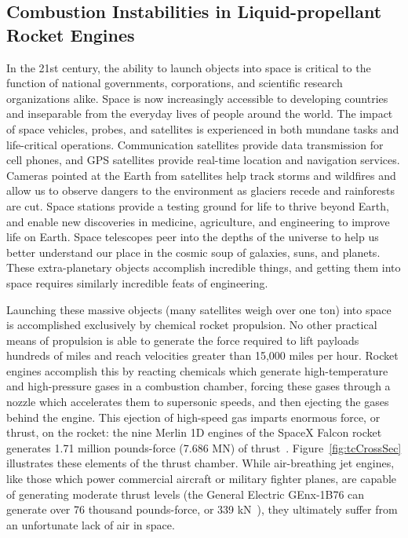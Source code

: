 \subsection{Combustion Instabilities in Liquid-propellant Rocket Engines}

In the 21st century, the ability to launch objects into space is critical to the function of national governments, corporations, and scientific research organizations alike. Space is now increasingly accessible to developing countries and inseparable from the everyday lives of people around the world. The impact of space vehicles, probes, and satellites is experienced in both mundane tasks and life-critical operations. Communication satellites provide data transmission for cell phones, and GPS satellites provide real-time location and navigation services. Cameras pointed at the Earth from satellites help track storms and wildfires and allow us to observe dangers to the environment as glaciers recede and rainforests are cut. Space stations provide a testing ground for life to thrive beyond Earth, and enable new discoveries in medicine, agriculture, and engineering to improve life on Earth. Space telescopes peer into the depths of the universe to help us better understand our place in the cosmic soup of galaxies, suns, and planets. These extra-planetary objects accomplish incredible things, and getting them into space requires similarly incredible feats of engineering.

Launching these massive objects (many satellites weigh over one ton) into space is accomplished exclusively by chemical rocket propulsion. No other practical means of propulsion is able to generate the force required to lift payloads hundreds of miles and reach velocities greater than 15,000 miles per hour. Rocket engines accomplish this by reacting chemicals which generate high-temperature and high-pressure gases in a combustion chamber, forcing these gases through a nozzle which accelerates them to supersonic speeds, and then ejecting the gases behind the engine. This ejection of high-speed gas imparts enormous force, or thrust, on the rocket: the nine Merlin 1D engines of the SpaceX Falcon rocket generates 1.71 million pounds-force (7.686 MN) of thrust~\cite{falconGuide}. Figure~\ref{fig:tcCrossSec} illustrates these elements of the thrust chamber. While air-breathing jet engines, like those which power commercial aircraft or military fighter planes, are capable of generating moderate thrust levels (the General Electric GEnx-1B76 can generate over 76 thousand pounds-force, or 339 kN~\cite{genxSpecs}), they ultimately suffer from an unfortunate lack of air in space.

